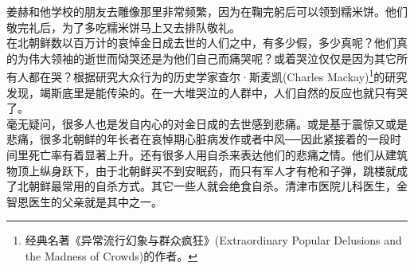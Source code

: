 \begin{multicols}{\theparacolNo}
姜赫和他学校的朋友去雕像那里非常频繁，因为在鞠完躬后可以领到糯米饼。他们敬完礼后，为了多吃糯米饼马上又去排队敬礼。\\

在北朝鲜数以百万计的哀悼金日成去世的人们之中，有多少假，多少真呢？他们真的为伟大领袖的逝世而恸哭还是为他们自己而痛哭呢？或着哭泣仅仅是因为其它所有人都在哭？根据研究大众行为的历史学家查尔·斯麦凯(Charles Mackay)\footnote{经典名著《异常流行幻象与群众疯狂》(Extraordinary Popular Delusions and the Madness of Crowds)的作者。}的研究发现，竭斯底里是能传染的。在一大堆哭泣的人群中，人们自然的反应也就只有哭了。\\

毫无疑问，很多人也是发自内心的对金日成的去世感到悲痛。或是基于震惊又或是悲痛，很多北朝鲜的年长者在哀悼期心脏病发作或者中风──因此紧接着的一段时间里死亡率有着显著上升。还有很多人用自杀来表达他们的悲痛之情。他们从建筑物顶上纵身跃下，由于北朝鲜买不到安眠药，而只有军人才有枪和子弹，跳楼就成了北朝鲜最常用的自杀方式。其它一些人就会绝食自杀。清津市医院儿科医生，金智恩医生的父亲就是其中之一。\\
\ifnum{}
	\end{multicols}
\fi